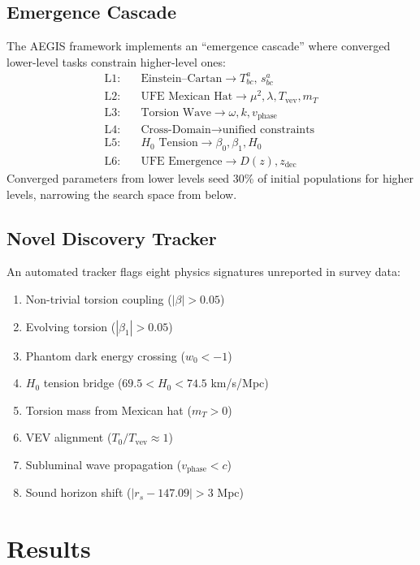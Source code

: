 \documentclass[twocolumn,prd,superscriptaddress,nofootinbib]{revtex4-2}
\begin{document}
\subsection{Emergence Cascade}

The AEGIS framework implements an ``emergence cascade'' where converged lower-level tasks constrain higher-level ones:
\begin{align*}
\text{L1:} &\quad \text{Einstein--Cartan} \to T^a_{bc}, \,s^a_{bc} \\
\text{L2:} &\quad \text{UFE Mexican Hat} \to \mu^2, \lambda, T_\text{vev}, m_T \\
\text{L3:} &\quad \text{Torsion Wave} \to \omega, k, v_\text{phase} \\
\text{L4:} &\quad \text{Cross-Domain} \to \text{unified constraints} \\
\text{L5:} &\quad H_0\text{ Tension} \to \beta_0, \beta_1, H_0 \\
\text{L6:} &\quad \text{UFE Emergence} \to D(z), z_\text{dec}
\end{align*}
Converged parameters from lower levels seed 30\% of initial populations for higher levels, narrowing the search space from below.

\subsection{Novel Discovery Tracker}

An automated tracker flags eight physics signatures unreported in survey data:
\begin{enumerate}
\item Non-trivial torsion coupling ($|\beta| > 0.05$)
\item Evolving torsion ($|\beta_1| > 0.05$)
\item Phantom dark energy crossing ($w_0 < -1$)
\item $H_0$ tension bridge ($69.5 < H_0 < 74.5$ km/s/Mpc)
\item Torsion mass from Mexican hat ($m_T > 0$)
\item VEV alignment ($T_0/T_\text{vev} \approx 1$)
\item Subluminal wave propagation ($v_\text{phase} < c$)
\item Sound horizon shift ($|r_s - 147.09| > 3$ Mpc)
\end{enumerate}

\section{Results}
\label{sec:results}
\end{document}
